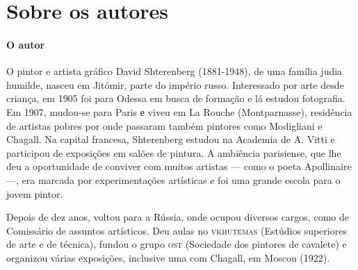 \documentclass[11pt]{extarticle}
\begin{document}
\section{Sobre os autores}

\reversemarginpar
\marginparwidth=5cm


\paragraph{O autor} O pintor e artista gráfico David Shterenberg (1881-1948), de uma família judia humilde, nasceu em Jitómir, parte do império russo. Interessado por arte desde criança, em 1905 foi para Odessa em busca de formação e lá estudou fotografia. Em 1907, mudou-se para Paris е viveu em La Rouche (Montparnasse), residência de artistas pobres por onde passaram também pintores como Modigliani e Chagall. Na capital francesa, Shterenberg estudou na Academia de A. Vitti e participou de exposições em salões de pintura. A ambiência parisiense, que lhe deu a oportunidade de conviver com muitos artistas --- como o poeta Apollinaire ---, era marcada por experimentações artísticas e foi uma grande escola para o jovem pintor. 

Depois de dez anos, voltou para a Rússia, onde ocupou diversos cargos, como de Comissário de assuntos artísticos. Deu aulas no 	\textsc{vkhutemas} (Estúdios superiores de arte e de técnica), fundou o grupo \textsc{ost} (Sociedade dos pintores de cavalete) e organizou várias exposições, inclusive uma com Chagall, em Moscou (1922). 
\end{document}
